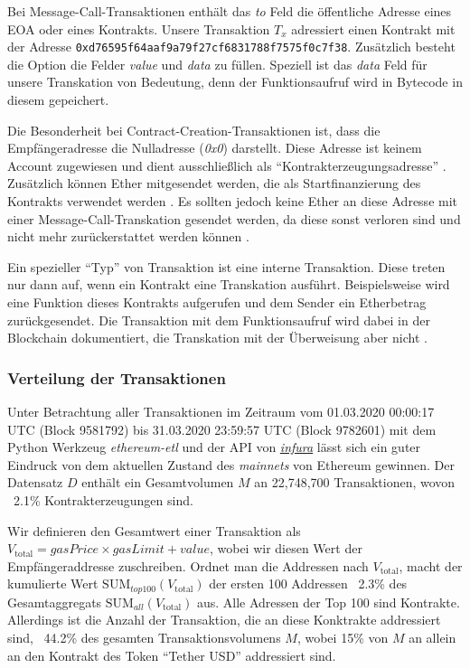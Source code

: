 \documentclass[runningheads]{llncs}
\begin{document}
Bei Message-Call-Transaktionen enthält das \textit{to} Feld die öffentliche Adresse eines EOA oder eines Kontrakts. Unsere Transaktion $T_x$ adressiert einen Kontrakt mit der Adresse \verb+0xd76595f64aaf9a79f27cf6831788f7575f0c7f38+. Zusätzlich besteht die Option die Felder \textit{value} und \textit{data} zu füllen. Speziell ist das \textit{data} Feld für unsere Transkation von Bedeutung, denn der Funktionsaufruf wird in Bytecode in diesem gepeichert.

Die Besonderheit bei Contract-Creation-Transaktionen ist, dass die Empfängeradresse die Nulladresse (\textit{0x0}) darstellt. Diese Adresse ist keinem Account zugewiesen und dient ausschließlich als "`Kontrakterzeugungsadresse"' \cite{antonopoulos_mastering_2019}. Zusätzlich können Ether mitgesendet werden, die als Startfinanzierung des Kontrakts verwendet werden \cite[S. 4]{wood_ethereum/yellowpaper_2019}. Es sollten jedoch keine Ether an diese Adresse mit einer Message-Call-Transkation gesendet werden, da diese sonst verloren sind und nicht mehr zurückerstattet werden können \cite[S. 112]{antonopoulos_mastering_2019}.

Ein spezieller "`Typ"' von Transaktion ist eine interne Transaktion. Diese treten nur dann auf, wenn ein Kontrakt eine Transkation ausführt. Beispielsweise wird eine Funktion dieses Kontrakts aufgerufen und dem Sender ein Etherbetrag zurückgesendet. Die Transaktion mit dem Funktionsaufruf wird dabei in der Blockchain dokumentiert, die Transkation mit der Überweisung aber nicht \cite[S. 40]{antonopoulos_mastering_2019}.

\subsubsection{Verteilung der Transaktionen}
Unter Betrachtung aller Transaktionen im Zeitraum vom 01.03.2020 00:00:17 UTC (Block 9581792) bis 31.03.2020 23:59:57 UTC (Block 9782601) mit dem Python Werkzeug \textit{ethereum-etl} \cite{noauthor_blockchain-etl/ethereum-etl_2020} und der API von \href{https://infura.io/}{\textit{infura}} lässt sich ein guter Eindruck von dem aktuellen Zustand des \textit{mainnets} von Ethereum gewinnen. Der Datensatz $ D $ enthält ein Gesamtvolumen $ M $ an 22,748,700 Transaktionen, wovon ~2.1\% Kontrakterzeugungen sind. 

Wir definieren den Gesamtwert einer Transaktion als $ V_{\text{total}} = \textit{gasPrice} \times \textit{gasLimit} + \textit{value} $, wobei wir diesen Wert der Empfängeraddresse zuschreiben. Ordnet man die Addressen nach $ V_{\text{total}} $, macht der kumulierte Wert $ \text{SUM}_{top100}(V_{\text{total}}) $ der ersten 100 Addressen ~2.3\% des Gesamtaggregats $ \text{SUM}_{all}(V_{\text{total}}) $ aus. Alle Adressen der Top 100 sind Kontrakte. Allerdings ist die Anzahl der Transaktion, die an diese Konktrakte addressiert sind, ~44.2\% des gesamten Transaktionsvolumens $ M $, wobei 15\% von $ M $ an allein an den Kontrakt des Token "`Tether USD"' addressiert sind. \cite{neemann_appendix_nodate}
\end{document}
